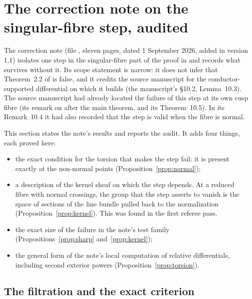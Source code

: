 \section{The correction note on the singular-fibre step, audited}\label{sec:correction}

The correction note (file , eleven pages, dated 1 September 2026, added in version 1.1) isolates one step in the singular-fibre part of the proof in \cite{CDP20} and records what survives without it. Its scope statement is narrow: it does not infer that Theorem~2.2 of \cite{CDP20} is false, and it credits the source manuscript for the conductor-supported differential on which it builds (the manuscript's §10.2, Lemma~10.3). The source manuscript had already located the failure of this step at its own cusp fibre (its remark on \cite{CDP20} after the main theorem, and its Theorem~10.5). In its Remark~10.4 it had also recorded that the step is valid when the fibre is normal.

This section states the note's results and reports the audit. It adds four things, each proved here:
\begin{itemize}
\item the exact condition for the torsion that makes the step fail: it is present exactly at the non-normal points (Proposition~\ref{prop:normal});
\item a description of the kernel sheaf on which the step depends. At a reduced fibre with normal crossings, the group that the step asserts to vanish is the space of sections of the line bundle pulled back to the normalization (Proposition~\ref{prop:kernel}). This was found in the first referee pass.
\item the exact size of the failure in the note's test family (Propositions~\ref{prop:sharp} and~\ref{prop:kernel});
\item the general form of the note's local computation of relative differentials, including second exterior powers (Proposition~\ref{prop:torsion}).
\end{itemize}

\subsection{The filtration and the exact criterion}

